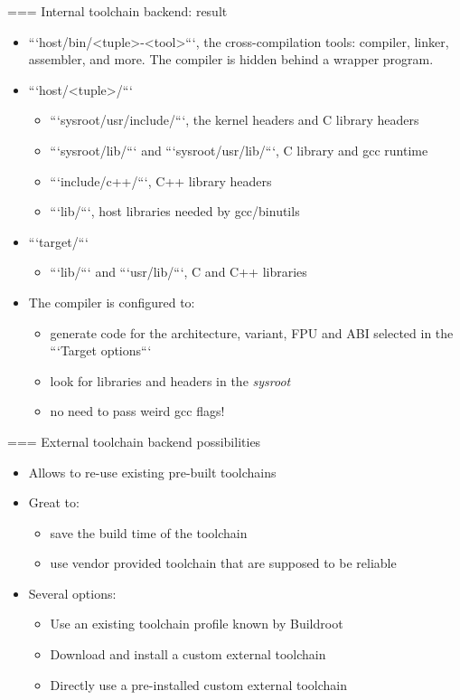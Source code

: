 === Internal toolchain backend: result
  \begin{itemize}
  \item ```host/bin/<tuple>-<tool>```, the cross-compilation
    tools: compiler, linker, assembler, and more. The compiler is
    hidden behind a wrapper program.
  \item ```host/<tuple>/```
    \begin{itemize}
    \item ```sysroot/usr/include/```, the kernel
      headers and C library headers
    \item ```sysroot/lib/``` and ```sysroot/usr/lib/```, C library and
      gcc runtime
    \item ```include/c++/```, C++ library headers
    \item ```lib/```, host libraries needed by gcc/binutils
    \end{itemize}
  \item ```target/```
    \begin{itemize}
    \item ```lib/``` and ```usr/lib/```, C and C++ libraries
    \end{itemize}
  \item The compiler is configured to:
    \begin{itemize}
    \item generate code for the architecture, variant, FPU and ABI
      selected in the ```Target options```
    \item look for libraries and headers in the {\em sysroot}
    \item no need to pass weird gcc flags!
    \end{itemize}
  \end{itemize}


=== External toolchain backend possibilities
  \begin{itemize}
  \item Allows to re-use existing pre-built toolchains
  \item Great to:
    \begin{itemize}
    \item save the build time of the toolchain
    \item use vendor provided toolchain that are supposed to be
      reliable
    \end{itemize}
  \item Several options:
    \begin{itemize}
    \item Use an existing toolchain profile known by Buildroot
    \item Download and install a custom external toolchain
    \item Directly use a pre-installed custom external toolchain
    \end{itemize}
  \end{itemize}


